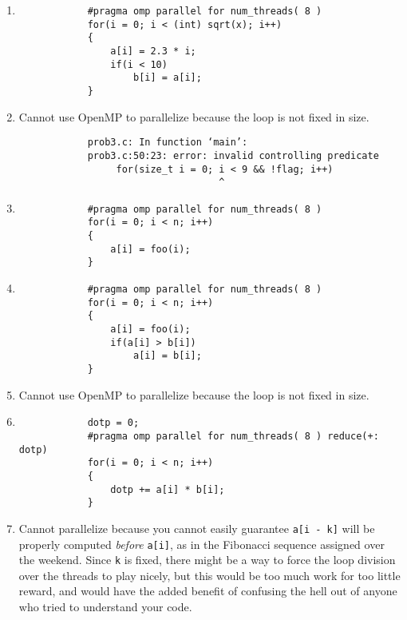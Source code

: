 \documentclass{article}
\begin{document}
    \begin{enumerate}
        \item \begin{verbatim}
            #pragma omp parallel for num_threads( 8 )
            for(i = 0; i < (int) sqrt(x); i++)
            {
                a[i] = 2.3 * i;
                if(i < 10)
                    b[i] = a[i];
            }
        \end{verbatim}

        \item Cannot use OpenMP to parallelize because the loop is not fixed in size.
        \begin{verbatim}
            prob3.c: In function ‘main’:
            prob3.c:50:23: error: invalid controlling predicate
                 for(size_t i = 0; i < 9 && !flag; i++)
                                   ^
        \end{verbatim}

        \item \begin{verbatim}
            #pragma omp parallel for num_threads( 8 )
            for(i = 0; i < n; i++)
            {
                a[i] = foo(i);
            }
        \end{verbatim}

        \item \begin{verbatim}
            #pragma omp parallel for num_threads( 8 )
            for(i = 0; i < n; i++)
            {
                a[i] = foo(i);
                if(a[i] > b[i])
                    a[i] = b[i];
            }
        \end{verbatim}

        \item Cannot use OpenMP to parallelize because the loop is not fixed in size.

        \item \begin{verbatim}
            dotp = 0;
            #pragma omp parallel for num_threads( 8 ) reduce(+: dotp)
            for(i = 0; i < n; i++)
            {
                dotp += a[i] * b[i];
            }
        \end{verbatim}

        \item Cannot parallelize because you cannot easily guarantee \texttt{a[i - k]} will be properly computed \textit{before} \texttt{a[i]}, as in the Fibonacci sequence assigned over the weekend. Since \texttt{k} is fixed, there might be a way to force the loop division over the threads to play nicely, but this would be too much work for too little reward, and would have the added benefit of confusing the hell out of anyone who tried to understand your code.


\end{enumerate}
\end{document}

